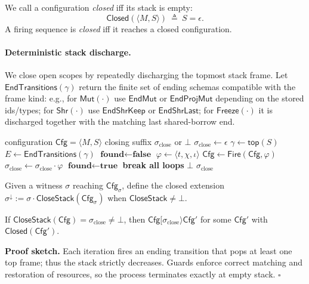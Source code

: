 \documentclass[runningheads]{llncs}
\newcommand{\Cfg}{\mathsf{Cfg}}
\newcommand{\Fire}{\mathsf{Fire}}
\newcommand{\SolveGuard}{\mathsf{SolveGuard}}
\newcommand{\Closed}{\mathsf{Closed}}
\begin{document}
We call a configuration \emph{closed} iff its stack is empty:
\[
\Closed(\langle M,S\rangle)\ \triangleq\ S=\epsilon.
\]
A firing sequence is \emph{closed} iff it reaches a closed configuration.

\paragraph{Deterministic stack discharge.}
We close open scopes by repeatedly discharging the topmost stack frame.
Let $\mathsf{EndTransitions}(\gamma)$ return the finite set of ending schemas compatible with the frame kind:
e.g., for $\mathsf{Mut}(\cdot)$ use $\mathsf{EndMut}$ or $\mathsf{EndProjMut}$ depending on the stored ids/types;
for $\mathsf{Shr}(\cdot)$ use $\mathsf{EndShrKeep}$ or $\mathsf{EndShrLast}$; for $\mathsf{Freeze}(\cdot)$
it is discharged together with the matching last shared-borrow end.

\begin{algorithm}[t]
\caption{$\mathsf{CloseStack}(\Cfg)$}
\label{alg:closestack2}
\begin{algorithmic}[1]
\REQUIRE configuration $\Cfg=\langle M,S\rangle$
\ENSURE closing suffix $\sigma_{\mathrm{close}}$ or $\bot$
\STATE $\sigma_{\mathrm{close}}\gets \epsilon$
  \STATE $\gamma \gets \mathsf{top}(S)$
  \STATE $E \gets \mathsf{EndTransitions}(\gamma)$
  \STATE $\textbf{found}\gets \textbf{false}$
      \FORALL{$\iota\in \SolveGuard(t,\Cfg,\chi)$}
        \STATE $\varphi\gets \langle t,\chi,\iota\rangle$
        \STATE $\Cfg\gets \Fire(\Cfg,\varphi)$
        \STATE $\sigma_{\mathrm{close}}\gets \sigma_{\mathrm{close}}\cdot \varphi$
        \STATE $\textbf{found}\gets \textbf{true}$
        \STATE \textbf{break all loops}
      \ENDFOR
    \ENDFOR
  \ENDFOR
   \RETURN $\bot$ \ENDIF
\ENDWHILE
\RETURN $\sigma_{\mathrm{close}}$
\end{algorithmic}
\end{algorithm}

Given a witness $\sigma$ reaching $\Cfg_\sigma$, define the closed extension
$\sigma^{\downarrow} := \sigma\cdot \mathsf{CloseStack}(\Cfg_\sigma)$ when $\mathsf{CloseStack}\neq\bot$.

\begin{lemma}
\label{lem:closing-correct}
If $\mathsf{CloseStack}(\Cfg)=\sigma_{\mathrm{close}}\neq\bot$, then
$\Cfg[\sigma_{\mathrm{close}}\rangle \Cfg'$ for some $\Cfg'$ with $\Closed(\Cfg')$.
\end{lemma}
\noindent\textbf{Proof sketch.}
Each iteration fires an ending transition that pops at least one top frame; thus the stack strictly decreases.
Guards enforce correct matching and restoration of resources, so the process terminates exactly at empty stack. \hfill $\square$
\end{document}
